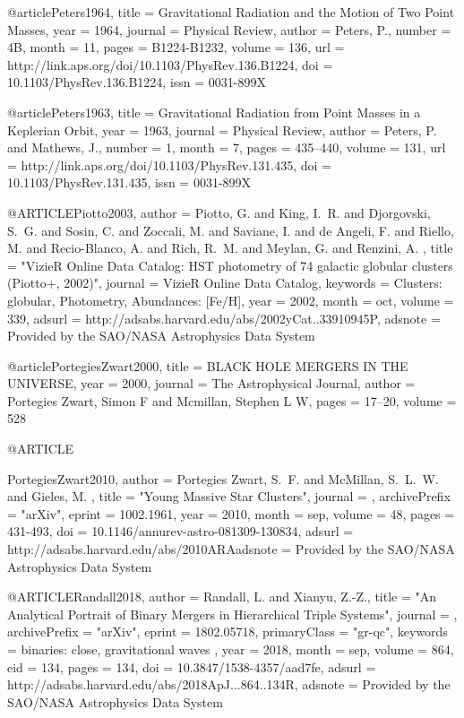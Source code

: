 \documentclass[twocolumn,tighten]{aastex63}
\begin{document}
{{{{{{@article{Peters1964,
    title = {{Gravitational Radiation and the Motion of Two Point Masses}},
    year = {1964},
    journal = {Physical Review},
    author = {Peters, P.},
    number = {4B},
    month = {11},
    pages = {B1224-B1232},
    volume = {136},
    url = {http://link.aps.org/doi/10.1103/PhysRev.136.B1224},
    doi = {10.1103/PhysRev.136.B1224},
    issn = {0031-899X}
}

@article{Peters1963,
    title = {{Gravitational Radiation from Point Masses in a Keplerian Orbit}},
    year = {1963},
    journal = {Physical Review},
    author = {Peters, P. and Mathews, J.},
    number = {1},
    month = {7},
    pages = {435--440},
    volume = {131},
    url = {http://link.aps.org/doi/10.1103/PhysRev.131.435},
    doi = {10.1103/PhysRev.131.435},
    issn = {0031-899X}
}

@ARTICLE{Piotto2003,
   author = {{Piotto}, G. and {King}, I.~R. and {Djorgovski}, S.~G. and {Sosin}, C. and 
	{Zoccali}, M. and {Saviane}, I. and {de Angeli}, F. and {Riello}, M. and 
	{Recio-Blanco}, A. and {Rich}, R.~M. and {Meylan}, G. and {Renzini}, A.
	},
    title = "{VizieR Online Data Catalog: HST photometry of 74 galactic globular clusters (Piotto+, 2002)}",
  journal = {VizieR Online Data Catalog},
 keywords = {Clusters: globular, Photometry, Abundances: [Fe/H]},
     year = 2002,
    month = oct,
   volume = 339,
   adsurl = {http://adsabs.harvard.edu/abs/2002yCat..33910945P},
  adsnote = {Provided by the SAO/NASA Astrophysics Data System}
}

@article{PortegiesZwart2000,
    title = {{BLACK HOLE MERGERS IN THE UNIVERSE}},
    year = {2000},
    journal = {The Astrophysical Journal},
    author = {Portegies Zwart, Simon F and Mcmillan, Stephen L W},
    pages = {17--20},
    volume = {528}
}

@ARTICLE{PortegiesZwart2010,
   author = {{Portegies Zwart}, S.~F. and {McMillan}, S.~L.~W. and {Gieles}, M.
	},
    title = "{Young Massive Star Clusters}",
  journal = {\araa},
archivePrefix = "arXiv",
   eprint = {1002.1961},
     year = 2010,
    month = sep,
   volume = 48,
    pages = {431-493},
      doi = {10.1146/annurev-astro-081309-130834},
   adsurl = {http://adsabs.harvard.edu/abs/2010ARAadsnote = {Provided by the SAO/NASA Astrophysics Data System}
}

@ARTICLE{Randall2018,
   author = {{Randall}, L. and {Xianyu}, Z.-Z.},
    title = "{An Analytical Portrait of Binary Mergers in Hierarchical Triple Systems}",
  journal = {\apj},
archivePrefix = "arXiv",
   eprint = {1802.05718},
 primaryClass = "gr-qc",
 keywords = {binaries: close, gravitational waves },
     year = 2018,
    month = sep,
   volume = 864,
      eid = {134},
    pages = {134},
      doi = {10.3847/1538-4357/aad7fe},
   adsurl = {http://adsabs.harvard.edu/abs/2018ApJ...864..134R},
  adsnote = {Provided by the SAO/NASA Astrophysics Data System}
}

}}}}}}}
\end{document}
